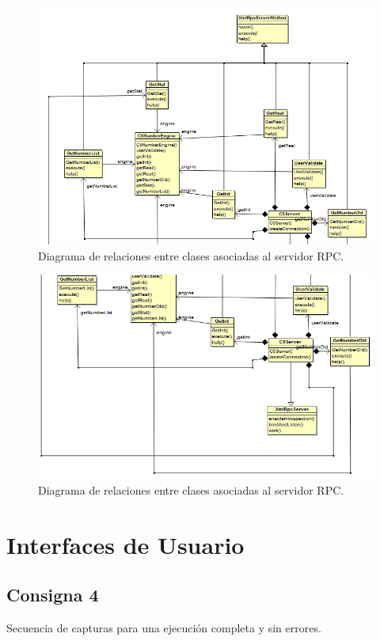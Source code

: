 \documentclass[a4paper,12pt]{article}
\begin{document}
\begin{figure}[htbp]
    \centering
    \includegraphics[width=\textwidth]{C5/Esquema_general_C5_server_server_1.PNG}
    \caption{Diagrama de relaciones entre clases asociadas al servidor RPC.}
    \label{fig:relaciones_rpc1}
\end{figure}

\begin{figure}[htbp]
    \centering
    \includegraphics[width=\textwidth]{C5/Esquema_general_C5_server_server_2.PNG}
    \caption{Diagrama de relaciones entre clases asociadas al servidor RPC.}
    \label{fig:relaciones_rpc2}
\end{figure}

\newpage
\section{Interfaces de Usuario}
\subsection{Consigna 4}
Secuencia de capturas para una ejecución completa y sin errores.
\end{document}
